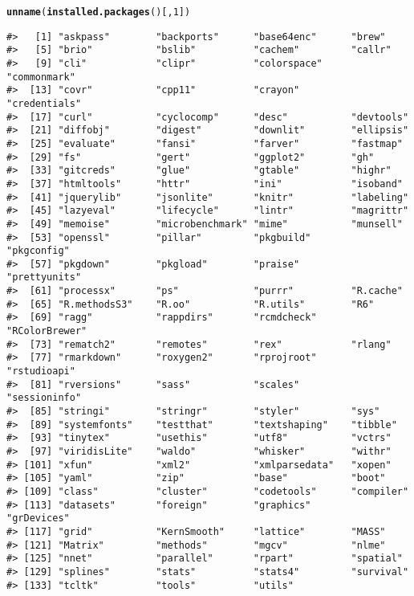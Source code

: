 \documentclass{article}\usepackage[]{graphicx}\usepackage{xcolor}
\makeatletter
\newcommand{\hlnum}[1]{\textcolor[rgb]{0.686,0.059,0.569}{#1}}%
\newcommand{\hlstd}[1]{\textcolor[rgb]{0.345,0.345,0.345}{#1}}%
\newcommand{\hlkwd}[1]{\textcolor[rgb]{0.737,0.353,0.396}{\textbf{#1}}}%
\newenvironment{kframe}{%
 \def\at@end@of@kframe{}%
 \ifinner\ifhmode%
  \def\at@end@of@kframe{\end{minipage}}%
  \begin{minipage}{\columnwidth}%
 \fi\fi%
 \def\FrameCommand##1{\hskip\@totalleftmargin \hskip-\fboxsep
 \colorbox{shadecolor}{##1}\hskip-\fboxsep
     \hskip-\linewidth \hskip-\@totalleftmargin \hskip\columnwidth}%
 \MakeFramed {\advance\hsize-\width
   \@totalleftmargin\z@ \linewidth\hsize
   \@setminipage}}%
 {\par\unskip\endMakeFramed%
 \at@end@of@kframe}
\newenvironment{knitrout}{}{} %
\makeatother
\begin{document}
\begin{knitrout}
\color{fgcolor}\begin{kframe}
\begin{alltt}
\hlkwd{unname}\hlstd{(}\hlkwd{installed.packages}\hlstd{()[,} \hlnum{1}\hlstd{])}
\end{alltt}
\begin{verbatim}
#>   [1] "askpass"        "backports"      "base64enc"      "brew"          
#>   [5] "brio"           "bslib"          "cachem"         "callr"         
#>   [9] "cli"            "clipr"          "colorspace"     "commonmark"    
#>  [13] "covr"           "cpp11"          "crayon"         "credentials"   
#>  [17] "curl"           "cyclocomp"      "desc"           "devtools"      
#>  [21] "diffobj"        "digest"         "downlit"        "ellipsis"      
#>  [25] "evaluate"       "fansi"          "farver"         "fastmap"       
#>  [29] "fs"             "gert"           "ggplot2"        "gh"            
#>  [33] "gitcreds"       "glue"           "gtable"         "highr"         
#>  [37] "htmltools"      "httr"           "ini"            "isoband"       
#>  [41] "jquerylib"      "jsonlite"       "knitr"          "labeling"      
#>  [45] "lazyeval"       "lifecycle"      "lintr"          "magrittr"      
#>  [49] "memoise"        "microbenchmark" "mime"           "munsell"       
#>  [53] "openssl"        "pillar"         "pkgbuild"       "pkgconfig"     
#>  [57] "pkgdown"        "pkgload"        "praise"         "prettyunits"   
#>  [61] "processx"       "ps"             "purrr"          "R.cache"       
#>  [65] "R.methodsS3"    "R.oo"           "R.utils"        "R6"            
#>  [69] "ragg"           "rappdirs"       "rcmdcheck"      "RColorBrewer"  
#>  [73] "rematch2"       "remotes"        "rex"            "rlang"         
#>  [77] "rmarkdown"      "roxygen2"       "rprojroot"      "rstudioapi"    
#>  [81] "rversions"      "sass"           "scales"         "sessioninfo"   
#>  [85] "stringi"        "stringr"        "styler"         "sys"           
#>  [89] "systemfonts"    "testthat"       "textshaping"    "tibble"        
#>  [93] "tinytex"        "usethis"        "utf8"           "vctrs"         
#>  [97] "viridisLite"    "waldo"          "whisker"        "withr"         
#> [101] "xfun"           "xml2"           "xmlparsedata"   "xopen"         
#> [105] "yaml"           "zip"            "base"           "boot"          
#> [109] "class"          "cluster"        "codetools"      "compiler"      
#> [113] "datasets"       "foreign"        "graphics"       "grDevices"     
#> [117] "grid"           "KernSmooth"     "lattice"        "MASS"          
#> [121] "Matrix"         "methods"        "mgcv"           "nlme"          
#> [125] "nnet"           "parallel"       "rpart"          "spatial"       
#> [129] "splines"        "stats"          "stats4"         "survival"      
#> [133] "tcltk"          "tools"          "utils"
\end{verbatim}
\end{kframe}
\end{knitrout}
\end{document}
